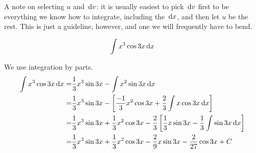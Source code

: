 A note on selecting $u$ and $\,\mathrm{d} v$: it is usually easiest to pick $\,\mathrm{d} v$ first to be everything we know how to integrate, including the $\,\mathrm{d} x$, and then let $u$ be the rest.
This is just a guideline, however, and one we will frequently have to bend.
\begin{ex}
  \[\int x^3 \cos{3x} \,\mathrm{d} x\]
  \begin{sol}
    We use integration by parts.
    \begin{align*}
      \int x^3 \cos{3x} \,\mathrm{d} x
      =& \frac{1}{3}x^3\sin{3x}-\int x^2 \sin{3x}\,\mathrm{d} x \\
      =& \frac{1}{3}x^3\sin{3x}-\left[
        \frac{-1}{3}x^2\cos{3x}+\frac{2}{3}\int x \cos{3x} \,\mathrm{d} x
        \right] \\
        =& \frac{1}{3}x^3\sin{3x}+\frac{1}{3}x^2\cos{3x}-\frac{2}{3}\left[\frac{1}{3}x\sin{3x}-\frac{1}{3}\int \sin{3x}\,\mathrm{d} x\right] \\
        =&\frac{1}{3}x^3\sin{3x}+\frac{1}{3}x^2\cos{3x}-\frac{2}{9}x\sin{3x}-\frac{2}{27}\cos{3x}+C
    \end{align*}
  \end{sol}
\end{ex}
